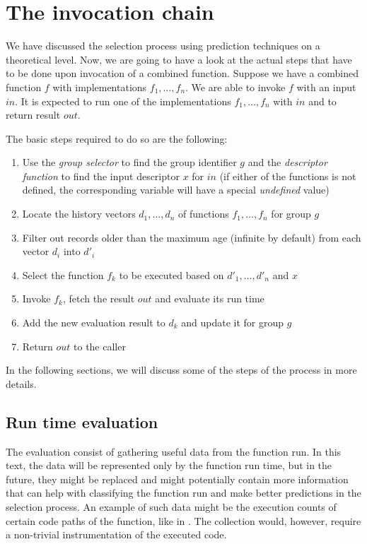 \section{The invocation chain}
\label{sec:selection_and_invocation_process}

We have discussed the selection process using prediction techniques on a theoretical level. Now, we are going to have a look at the actual steps that have to be done upon invocation of a combined function. Suppose we have a combined function $f$ with implementations $f_1,\dots,f_n$. We are able to invoke $f$ with an input $in$. It is expected to run one of the implementations $f_1,\dots,f_n$ with $in$ and to return result $out$.

The basic steps required to do so are the following:

\begin{enumerate}
	\item Use the \textit{group selector} to find the group identifier $g$ and the \textit{descriptor function} to find the input descriptor $x$ for $in$ (if either of the functions is not defined, the corresponding variable will have a special \textit{undefined} value)
	\item Locate the history vectors $d_1,\dots,d_n$ of functions $f_1,\dots,f_n$ for group $g$
	\item Filter out records older than the maximum age (infinite by default) from each vector $d_i$ into $d'_i$
	\item Select the function $f_k$ to be executed based on $d'_1,\dots,d'_n$ and $x$
	\item Invoke $f_k$, fetch the result $out$ and evaluate its run time
	\item Add the new evaluation result to $d_k$ and update it for group $g$
	\item Return $out$ to the caller
\end{enumerate}

In the following sections, we will discuss some of the steps of the process in more details.

\subsection{Run time evaluation}

The evaluation consist of gathering useful data from the function run. In this text, the data will be represented only by the function run time, but in the future, they might be replaced and might potentially contain more information that can help with classifying the function run and make better predictions in the selection process. An example of such data might be the execution counts of certain code paths of the function, like in \cite{chun_mantis:_2010}. The collection would, however, require a non-trivial instrumentation of the executed code.

